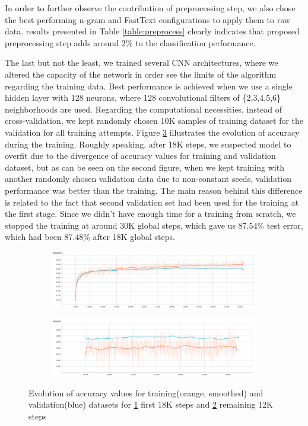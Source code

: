 In order to further observe the contribution of preprocessing step, we also chose the best-performing n-gram and FastText configurations to apply them to raw data.
results presented in Table \ref{table:preprocess} clearly indicates that proposed preprocessing step adds around $2\%$ to the classification performance.



The last but not the least, we trained several CNN architectures, where we altered the capacity of the network in order see the limits of the algorithm regarding the training data.
Best performance is achieved when we use a single hidden layer with 128 neurons, where 128 convolutional filters of \{2,3,4,5,6\} neighborhoods are used.
Regarding the computational necessities, instead of cross-validation, we kept randomly chosen 10K samples of training dataset for the validation for all training attempts.
Figure \ref{fig:cnn_train} illustrates the evolution of accuracy during the training.
Roughly speaking, after 18K steps, we suspected model to overfit due to the divergence of accuracy values for training and validation dataset, but as can be seen on the second figure, when we kept training with another randomly chosen validation data due to non-constant seeds, validation performance was better than the training.
The main reason behind this difference is related to the fact that second validation set had been used for the training at the first stage.
Since we didn't have enough time for a training from scratch, we stopped the training at around 30K global steps, which gave us $87.54\%$ test error, which had been $87.48\%$ after 18K global steps.

\begin{figure}[h!]
	\centering
	\begin{subfigure}{0.8\columnwidth}
		\centering
		\includegraphics[width=\linewidth]{accuracy1.png}
		\caption{}
		\label{fig:18k}
	\end{subfigure}
	\begin{subfigure}{0.8\columnwidth}
		\centering
		\includegraphics[width=\linewidth]{accuracy2.png}
		\caption{}
		\label{fig:30k}
	\end{subfigure}
	\caption{Evolution of accuracy values for training(orange, smoothed) and validation(blue) datasets for \ref{fig:18k} first 18K steps and \ref{fig:30k} remaining 12K steps}
	\label{fig:cnn_train}
\end{figure}


